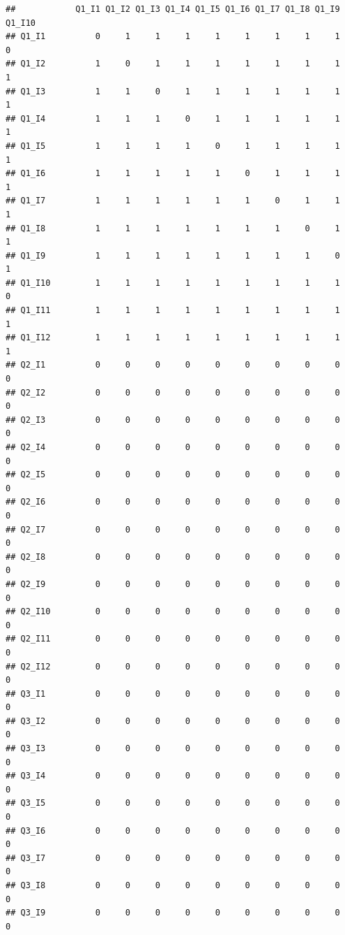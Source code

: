 \documentclass[]{book}
\begin{document}
\begin{verbatim}
##            Q1_I1 Q1_I2 Q1_I3 Q1_I4 Q1_I5 Q1_I6 Q1_I7 Q1_I8 Q1_I9 Q1_I10
## Q1_I1          0     1     1     1     1     1     1     1     1      0
## Q1_I2          1     0     1     1     1     1     1     1     1      1
## Q1_I3          1     1     0     1     1     1     1     1     1      1
## Q1_I4          1     1     1     0     1     1     1     1     1      1
## Q1_I5          1     1     1     1     0     1     1     1     1      1
## Q1_I6          1     1     1     1     1     0     1     1     1      1
## Q1_I7          1     1     1     1     1     1     0     1     1      1
## Q1_I8          1     1     1     1     1     1     1     0     1      1
## Q1_I9          1     1     1     1     1     1     1     1     0      1
## Q1_I10         1     1     1     1     1     1     1     1     1      0
## Q1_I11         1     1     1     1     1     1     1     1     1      1
## Q1_I12         1     1     1     1     1     1     1     1     1      1
## Q2_I1          0     0     0     0     0     0     0     0     0      0
## Q2_I2          0     0     0     0     0     0     0     0     0      0
## Q2_I3          0     0     0     0     0     0     0     0     0      0
## Q2_I4          0     0     0     0     0     0     0     0     0      0
## Q2_I5          0     0     0     0     0     0     0     0     0      0
## Q2_I6          0     0     0     0     0     0     0     0     0      0
## Q2_I7          0     0     0     0     0     0     0     0     0      0
## Q2_I8          0     0     0     0     0     0     0     0     0      0
## Q2_I9          0     0     0     0     0     0     0     0     0      0
## Q2_I10         0     0     0     0     0     0     0     0     0      0
## Q2_I11         0     0     0     0     0     0     0     0     0      0
## Q2_I12         0     0     0     0     0     0     0     0     0      0
## Q3_I1          0     0     0     0     0     0     0     0     0      0
## Q3_I2          0     0     0     0     0     0     0     0     0      0
## Q3_I3          0     0     0     0     0     0     0     0     0      0
## Q3_I4          0     0     0     0     0     0     0     0     0      0
## Q3_I5          0     0     0     0     0     0     0     0     0      0
## Q3_I6          0     0     0     0     0     0     0     0     0      0
## Q3_I7          0     0     0     0     0     0     0     0     0      0
## Q3_I8          0     0     0     0     0     0     0     0     0      0
## Q3_I9          0     0     0     0     0     0     0     0     0      0

\end{verbatim}
\end{document}
